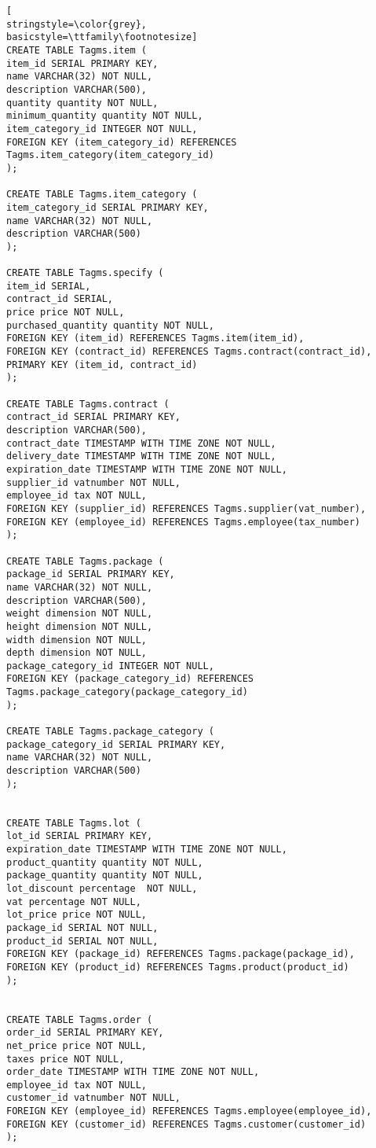 \begin{lstlisting}[
stringstyle=\color{grey},
basicstyle=\ttfamily\footnotesize]
CREATE TABLE Tagms.item (
item_id SERIAL PRIMARY KEY,
name VARCHAR(32) NOT NULL,
description VARCHAR(500),
quantity quantity NOT NULL,
minimum_quantity quantity NOT NULL,
item_category_id INTEGER NOT NULL,
FOREIGN KEY (item_category_id) REFERENCES Tagms.item_category(item_category_id)
);

CREATE TABLE Tagms.item_category (
item_category_id SERIAL PRIMARY KEY,
name VARCHAR(32) NOT NULL,
description VARCHAR(500)
);

CREATE TABLE Tagms.specify (
item_id SERIAL,
contract_id SERIAL,
price price NOT NULL,
purchased_quantity quantity NOT NULL,
FOREIGN KEY (item_id) REFERENCES Tagms.item(item_id),
FOREIGN KEY (contract_id) REFERENCES Tagms.contract(contract_id),
PRIMARY KEY (item_id, contract_id)
);

CREATE TABLE Tagms.contract (
contract_id SERIAL PRIMARY KEY,
description VARCHAR(500),
contract_date TIMESTAMP WITH TIME ZONE NOT NULL,
delivery_date TIMESTAMP WITH TIME ZONE NOT NULL,
expiration_date TIMESTAMP WITH TIME ZONE NOT NULL,
supplier_id vatnumber NOT NULL,
employee_id tax NOT NULL,
FOREIGN KEY (supplier_id) REFERENCES Tagms.supplier(vat_number),
FOREIGN KEY (employee_id) REFERENCES Tagms.employee(tax_number)
);

CREATE TABLE Tagms.package (
package_id SERIAL PRIMARY KEY,
name VARCHAR(32) NOT NULL,
description VARCHAR(500),
weight dimension NOT NULL,
height dimension NOT NULL,
width dimension NOT NULL,
depth dimension NOT NULL,
package_category_id INTEGER NOT NULL,
FOREIGN KEY (package_category_id) REFERENCES Tagms.package_category(package_category_id)
);

CREATE TABLE Tagms.package_category (
package_category_id SERIAL PRIMARY KEY,
name VARCHAR(32) NOT NULL,
description VARCHAR(500)
);


CREATE TABLE Tagms.lot (
lot_id SERIAL PRIMARY KEY,
expiration_date TIMESTAMP WITH TIME ZONE NOT NULL,
product_quantity quantity NOT NULL,
package_quantity quantity NOT NULL,
lot_discount percentage  NOT NULL,
vat percentage NOT NULL,
lot_price price NOT NULL,
package_id SERIAL NOT NULL,
product_id SERIAL NOT NULL,
FOREIGN KEY (package_id) REFERENCES Tagms.package(package_id),
FOREIGN KEY (product_id) REFERENCES Tagms.product(product_id)
);


CREATE TABLE Tagms.order (
order_id SERIAL PRIMARY KEY,
net_price price NOT NULL,
taxes price NOT NULL,
order_date TIMESTAMP WITH TIME ZONE NOT NULL,
employee_id tax NOT NULL,
customer_id vatnumber NOT NULL,
FOREIGN KEY (employee_id) REFERENCES Tagms.employee(employee_id),
FOREIGN KEY (customer_id) REFERENCES Tagms.customer(customer_id)
);


\end{lstlisting}
